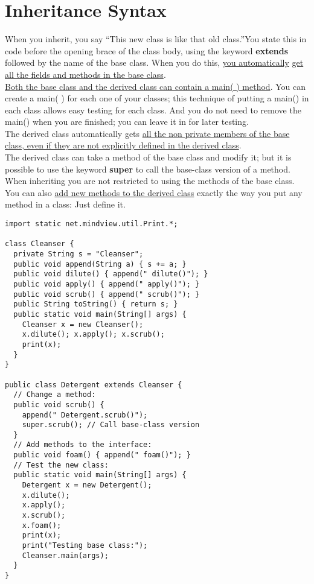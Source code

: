 \documentclass[10pt,letterpaper]{report}
\begin{document}
\section{Inheritance Syntax}
When you inherit, you say ``This new class is like that old class.''You state this in code before the opening brace of the class body, using the keyword \textbf{extends} followed by the name of the base class. When you do this, \underline{you automatically} \underline{get all the fields and methods in the base class}.\\

\underline{Both the base class and the derived class can contain a main( ) method}. You can create a main( ) for each one of your classes; this technique of putting a main() in each class allows easy testing for each class. And you do not need to remove the main() when you are finished; you can leave it in for later testing.\\

The derived class automatically gets \underline{all the non private members of the base} \underline{class, even if they are not explicitly defined in the derived class}.\\

The derived class can take a method of the base class and modify it; but it is possible to use the keyword \textbf{super} to call the base-class version of a method.\\

When inheriting you are not restricted to using the methods of the base class. You can also \underline{add new methods to the derived class} exactly the way you put any method in a class: Just define it.
\begin{lstlisting}
import static net.mindview.util.Print.*;

class Cleanser {
  private String s = "Cleanser";
  public void append(String a) { s += a; }
  public void dilute() { append(" dilute()"); }
  public void apply() { append(" apply()"); }
  public void scrub() { append(" scrub()"); }
  public String toString() { return s; }
  public static void main(String[] args) {
    Cleanser x = new Cleanser();
    x.dilute(); x.apply(); x.scrub();
    print(x);
  }
}	

public class Detergent extends Cleanser {
  // Change a method:
  public void scrub() {
    append(" Detergent.scrub()");
    super.scrub(); // Call base-class version
  }
  // Add methods to the interface:
  public void foam() { append(" foam()"); }
  // Test the new class:
  public static void main(String[] args) {
    Detergent x = new Detergent();
    x.dilute();
    x.apply();
    x.scrub();
    x.foam();
    print(x);
    print("Testing base class:");
    Cleanser.main(args);
  }	
}
\end{lstlisting}
\end{document}

